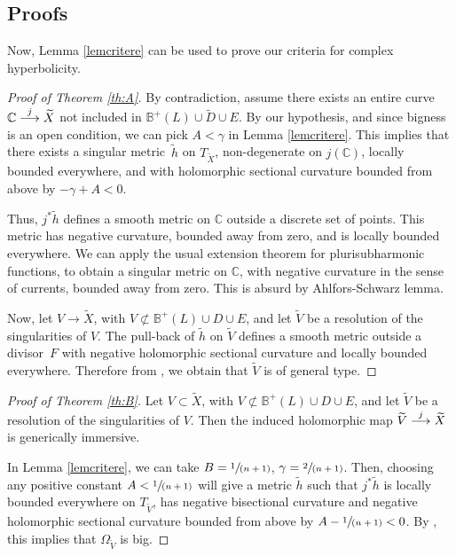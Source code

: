 \documentclass[JEP,XML,SOM,Unicode]{cedram}
\newcommand{\spfrac}[2]{\sfrac{#1}{(#2)}}
\def\To#1{\mathchoice{\xrightarrow{\textstyle\kern4pt#1\kern3pt}}{\stackrel{#1}{\longrightarrow}}{}{}}
\theoremstyle{plain}
\theoremstyle{definition}
\numberwithin{equation}{theorem}
\begin{document}
\subsection{Proofs}

Now, Lemma \ref{lemcritere} can be used to prove our criteria for complex hyper\-bolicity.

\begin{proof}[Proof of Theorem \ref{th:A}]

By contradiction, assume there exists an entire curve $\mathbb C \To{j} \widetilde{X}$ not included in $\mathbb B^+(L) \cup \widetilde{D} \cup E$. By our hypothesis, and since bigness is an open condition, we can pick $A < \gamma$ in Lemma \ref{lemcritere}. This implies that there exists a singular metric~$\widetilde{h}$ on $T_{\widetilde{X}}$, non-degenerate on $j(\mathbb C)$, locally bounded everywhere, and with holomorphic sectional curvature bounded from above by $- \gamma + A < 0$.

Thus, $j^\ast \widetilde{h}$ defines a smooth metric on $\mathbb C$ outside a discrete set of points. This metric has negative curvature, bounded away from zero, and is locally bounded everywhere. We can apply the usual extension theorem for plurisubharmonic functions, to obtain a singular metric on $\mathbb C$, with negative curvature in the sense of currents, bounded away from zero. This is absurd by Ahlfors-Schwarz lemma.

Now, let $V \to \widetilde{X}$, with $V \not\subset \mathbb B^+(L) \cup D \cup E$, and let $\widetilde{V}$ be a resolution of the singularities of $V$. The pull-back of $\widetilde{h}$ on $\widetilde{V}$ defines a smooth metric outside a divisor~$F$ with negative holomorphic sectional curvature and locally bounded everywhere. Therefore from \cite[Th.\,B]{G18}, we obtain that $\widetilde{V}$ is of general type.
\end{proof}

\begin{proof}[Proof of Theorem \ref{th:B}] Let $V \subset \widetilde{X}$, with $V \not\subset \mathbb B^+(L) \cup D \cup E$, and let $\widetilde{V}$ be a resolution of the singularities of $V$. Then the induced holomorphic map $\widetilde{V} \To{j} \widetilde{X}$ is generically immersive.

In Lemma \ref{lemcritere}, we can take $B = \spfrac{1}{n+1}$, $\gamma = \spfrac{2}{n+1}$. Then, choosing any positive constant $A < \spfrac{1}{n+1}$ will give a metric $\widetilde{h}$ such that $j^\ast \widetilde{h}$ is locally bounded everywhere on $T_{\widetilde{V}}$, has negative bisectional curvature and negative holomorphic sectional curvature bounded from above by $A - \spfrac{1}{n+1} < 0$. By \cite{cad16}, this implies that $\Omega_{\widetilde{V}}$ is big.
\end{proof}
\end{document}
